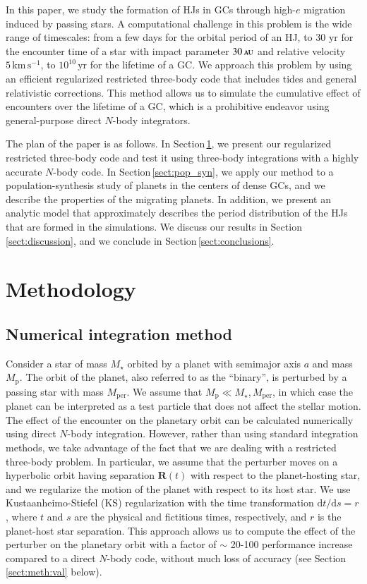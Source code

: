 \documentclass[iop,usenatbib]{emulateapj}
\renewcommand{\S}{Section}
\newcommand{\ve}[1]{\boldsymbol{#1}}
\newcommand{\au}{\,\textsc{au}}
\newcommand{\mper}{M_\mathrm{per}}
\begin{document}
In this paper, we study the formation of HJs in GCs through high-$e$ migration induced by passing stars. A computational challenge in this problem is the wide range of timescales: from a few days for the orbital period of an HJ, to 30 yr for the encounter time of a star with impact parameter $30\au$ and relative velocity $5\,\mathrm{km\,s^{-1}}$, to $10^{10}\,\mathrm{yr}$ for the lifetime of a GC. We approach this problem by using an efficient regularized restricted three-body code that includes tides and general relativistic corrections. This method allows us to simulate the cumulative effect of encounters over the lifetime of a GC, which is a prohibitive endeavor using general-purpose direct $N$-body integrators. 

The plan of the paper is as follows. In \S\,\ref{sect:meth}, we present our regularized restricted three-body code and test it using three-body integrations with a highly accurate $N$-body code. In \S\,\ref{sect:pop_syn}, we apply our method to a population-synthesis study of planets in the centers of dense GCs, and we describe the properties of the migrating planets. In addition, we present an analytic model that approximately describes the period distribution of the HJs that are formed in the simulations. We discuss our results in \S\,\ref{sect:discussion}, and we conclude in \S\,\ref{sect:conclusions}.



\section{Methodology}
\label{sect:meth}

\subsection{Numerical integration method}
\label{sect:meth:des}

Consider a star of mass $M_\star$ orbited by a planet with semimajor axis $a$ and mass $M_\mathrm{p}$. The orbit of the planet, also referred to as the ``binary'', is perturbed by a passing star with mass $\mper$. We assume that $M_\mathrm{p} \ll M_\star,\mper$, in which case the planet can be interpreted as a test particle that does not affect the stellar motion. The effect of the encounter on the planetary orbit can be calculated numerically using direct $N$-body integration. However, rather than using standard integration methods, we take advantage of the fact that we are dealing with a restricted three-body problem. In particular, we assume that the perturber moves on a hyperbolic orbit having separation $\ve{R}(t)$ with respect to the planet-hosting star, and we regularize the motion of the planet with respect to its host star. We use Kustaanheimo-Stiefel (KS) regularization \citep{ks65,1971lrcm.book.....S} with the time transformation $\mathrm{d} t/\mathrm{d} s = r$, where $t$ and $s$ are the physical and fictitious times, respectively, and $r$ is the planet-host star separation. This approach allows us to compute the effect of the perturber on the planetary orbit with a factor of $\sim$ 20-100 performance increase compared to a direct $N$-body code, without much loss of accuracy (see \S\,\ref{sect:meth:val} below).
\end{document}
